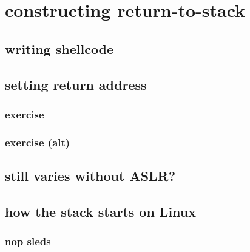 \section{constructing return-to-stack}


\subsection{writing shellcode}




\subsection{setting return address}


\subsubsection{exercise}


\subsubsection{exercise (alt)}



\subsection{still varies without ASLR?}


\subsection{how the stack starts on Linux}


\subsubsection{nop sleds}




